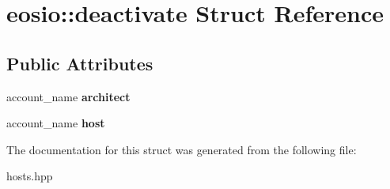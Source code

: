 \hypertarget{structeosio_1_1deactivate}{}\section{eosio\+:\+:deactivate Struct Reference}
\label{structeosio_1_1deactivate}
\subsection*{Public Attributes}
\begin{DoxyCompactItemize}
\item 
\mbox{\label{structeosio_1_1deactivate_a599ba032be600ed975ca24e1b1c9fce3}} 
account\+\_\+name {\bfseries architect}
\item 
\mbox{\label{structeosio_1_1deactivate_ae67b89c1668d1b1ade830e0e7e394fd3}} 
account\+\_\+name {\bfseries host}
\end{DoxyCompactItemize}


The documentation for this struct was generated from the following file\+:\begin{DoxyCompactItemize}
\item 
hosts.\+hpp\end{DoxyCompactItemize}
